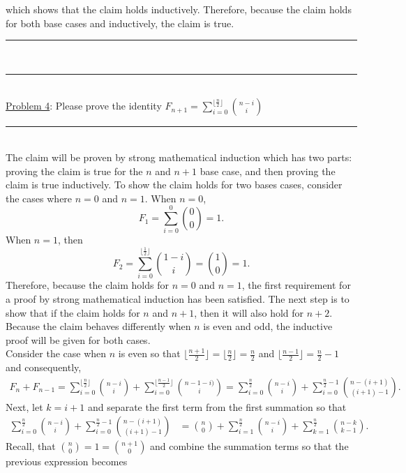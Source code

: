 \documentclass{article}
\newcommand{\problemsep}{\leavevmode\\[0.05in] \rule[\baselineskip/4]{\textwidth}{1pt} \\[0.005in] \rule[\baselineskip]{\textwidth}{1pt}\vspace{-\baselineskip/2}\leavevmode\\[0.05in]}
\newcommand{\statementsep}{\leavevmode\\[0.005in] \rule[\baselineskip/4]{\textwidth}{0.4pt}\leavevmode\\[0.005in]}
\begin{document}
which shows that the claim holds inductively.  Therefore, because the claim holds for both base cases and inductively, the claim is true.
\problemsep
\noindent\underline{Problem 4}: Please prove the identity $\displaystyle F_{n+1} = \sum_{i=0}^{\lfloor \frac{n}{2} \rfloor}{n - i \choose i}$
\statementsep
The claim will be proven by strong mathematical induction which has two parts: proving the claim is true for the $n$ and $n+1$ base case, and then proving the claim is true inductively. To show the claim holds for two bases cases, consider the cases where $n = 0$ and $n = 1$. When $n = 0$, 
\begin{equation*}
F_1 = \sum_{i=0}^0 {0 \choose 0} = 1.
\end{equation*}
When $n = 1$, then 
\begin{equation*}
F_2 = \sum_{i=0}^{\lfloor \frac{1}{2} \rfloor} {1 - i \choose i}  = {1 \choose 0} = 1.
\end{equation*}
Therefore, because the claim holds for $n = 0$ and $n = 1$, the first requirement for a proof by strong mathematical induction has been satisfied. The next step is to show that if the claim holds for $n$ and $n+1$, then it will also hold for $n+2$. Because the claim behaves differently when $n$ is even and odd, the inductive proof will be given for both cases.
\\[0.1in] \noindent Consider the case when $n$ is even so that $\lfloor \frac{n+1}{2} \rfloor = \lfloor \frac{n}{2} \rfloor  = \frac{n}{2}$ and $\lfloor \frac{n-1}{2} \rfloor = \frac{n}{2}-1$ and consequently,
\begin{equation*}\begin{aligned}
F_n + F_{n-1} = \sum_{i=0}^{\lfloor \frac{n}{2}\rfloor} {n-i \choose i} + \sum_{i=0}^{\lfloor \frac{n-1}{2}\rfloor} {n-1 - i) \choose i} = \sum_{i=0}^{\frac{n}{2}} {n-i\choose i} + \sum_{i=0}^{\frac{n}{2}-1} {n-(i+1) \choose (i+1) - 1}.
\end{aligned}\end{equation*}
Next, let $k = i+1$ and separate the first term from the first summation so that 
\begin{equation*}\begin{aligned}
 \sum_{i=0}^{\frac{n}{2}} {n-i\choose i} + \sum_{i=0}^{\frac{n}{2}-1} {n-(i+1) \choose (i+1) - 1}&= {n \choose 0} + \sum_{i=1}^{\frac{n}{2}} {n-i \choose i} + \sum_{k=1}^{\frac{n}{2}} {n-k \choose k-1}.
\end{aligned}\end{equation*}
Recall, that ${n \choose 0} = 1 = {n+1 \choose 0}$ and combine the summation terms so that the previous expression becomes
\end{document}
